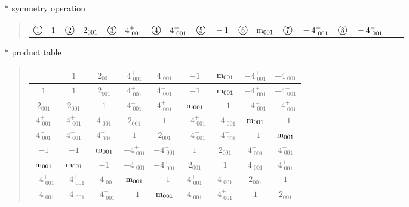 \documentclass[fleqn,10pt,landscape]{jsarticle}
\begin{document}
* symmetry operation
\begin{quote}
\begin{tabular}{llllllllll}
$ {\ooalign{\hfil\resizebox{.8\width}{\height}{1}\hfil\crcr\raise.1ex\hbox{\large$\bigcirc$}}}\quad 1 $ & $ {\ooalign{\hfil\resizebox{.8\width}{\height}{2}\hfil\crcr\raise.1ex\hbox{\large$\bigcirc$}}}\quad 2{}_{001} $ & $ {\ooalign{\hfil\resizebox{.8\width}{\height}{3}\hfil\crcr\raise.1ex\hbox{\large$\bigcirc$}}}\quad 4^{+}_{\,\,001} $ & $ {\ooalign{\hfil\resizebox{.8\width}{\height}{4}\hfil\crcr\raise.1ex\hbox{\large$\bigcirc$}}}\quad 4^{-}_{\,\,001} $ & $ {\ooalign{\hfil\resizebox{.8\width}{\height}{5}\hfil\crcr\raise.1ex\hbox{\large$\bigcirc$}}}\quad -1 $ & $ {\ooalign{\hfil\resizebox{.8\width}{\height}{6}\hfil\crcr\raise.1ex\hbox{\large$\bigcirc$}}}\quad {\rm m}_{001} $ & $ {\ooalign{\hfil\resizebox{.8\width}{\height}{7}\hfil\crcr\raise.1ex\hbox{\large$\bigcirc$}}}\quad -4^{+}_{\,\,001} $ & $ {\ooalign{\hfil\resizebox{.8\width}{\height}{8}\hfil\crcr\raise.1ex\hbox{\large$\bigcirc$}}}\quad -4^{-}_{\,\,001} $
\end{tabular}
\end{quote}

* product table
\begin{quote}
\begin{tabular}{ccccccccc} \hline \hline
 & $ 1 $ & $ 2{}_{001} $ & $ 4^{+}_{\,\,001} $ & $ 4^{-}_{\,\,001} $ & $ -1 $ & $ {\rm m}_{001} $ & $ -4^{+}_{\,\,001} $ & $ -4^{-}_{\,\,001} $ \\ \hline
$ 1 $ & $ 1 $ & $ 2{}_{001} $ & $ 4^{+}_{\,\,001} $ & $ 4^{-}_{\,\,001} $ & $ -1 $ & $ {\rm m}_{001} $ & $ -4^{+}_{\,\,001} $ & $ -4^{-}_{\,\,001} $ \\
$ 2{}_{001} $ & $ 2{}_{001} $ & $ 1 $ & $ 4^{-}_{\,\,001} $ & $ 4^{+}_{\,\,001} $ & $ {\rm m}_{001} $ & $ -1 $ & $ -4^{-}_{\,\,001} $ & $ -4^{+}_{\,\,001} $ \\
$ 4^{+}_{\,\,001} $ & $ 4^{+}_{\,\,001} $ & $ 4^{-}_{\,\,001} $ & $ 2{}_{001} $ & $ 1 $ & $ -4^{+}_{\,\,001} $ & $ -4^{-}_{\,\,001} $ & $ {\rm m}_{001} $ & $ -1 $ \\
$ 4^{-}_{\,\,001} $ & $ 4^{-}_{\,\,001} $ & $ 4^{+}_{\,\,001} $ & $ 1 $ & $ 2{}_{001} $ & $ -4^{-}_{\,\,001} $ & $ -4^{+}_{\,\,001} $ & $ -1 $ & $ {\rm m}_{001} $ \\
$ -1 $ & $ -1 $ & $ {\rm m}_{001} $ & $ -4^{+}_{\,\,001} $ & $ -4^{-}_{\,\,001} $ & $ 1 $ & $ 2{}_{001} $ & $ 4^{+}_{\,\,001} $ & $ 4^{-}_{\,\,001} $ \\
$ {\rm m}_{001} $ & $ {\rm m}_{001} $ & $ -1 $ & $ -4^{-}_{\,\,001} $ & $ -4^{+}_{\,\,001} $ & $ 2{}_{001} $ & $ 1 $ & $ 4^{-}_{\,\,001} $ & $ 4^{+}_{\,\,001} $ \\
$ -4^{+}_{\,\,001} $ & $ -4^{+}_{\,\,001} $ & $ -4^{-}_{\,\,001} $ & $ {\rm m}_{001} $ & $ -1 $ & $ 4^{+}_{\,\,001} $ & $ 4^{-}_{\,\,001} $ & $ 2{}_{001} $ & $ 1 $ \\
$ -4^{-}_{\,\,001} $ & $ -4^{-}_{\,\,001} $ & $ -4^{+}_{\,\,001} $ & $ -1 $ & $ {\rm m}_{001} $ & $ 4^{-}_{\,\,001} $ & $ 4^{+}_{\,\,001} $ & $ 1 $ & $ 2{}_{001} $ \\
 \hline \hline
\end{tabular}
\end{quote}
\end{document}
